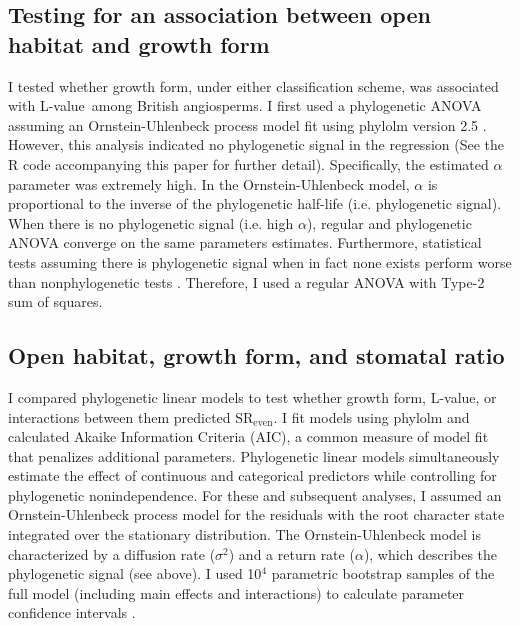 \documentclass[12pt, oneside]{article}
\newcommand{\pkg}[1]{{\fontseries{b}\selectfont #1}}
\newcommand{\el}{L-value}
\begin{document}
\subsection*{Testing for an association between open habitat and growth form}

I tested whether growth form, under either classification scheme, was associated with \el~among British angiosperms. I first used a phylogenetic ANOVA assuming an Ornstein-Uhlenbeck process model fit using \pkg{phylolm} version 2.5 \citep{Ho_Ane_2014}. However, this analysis indicated no phylogenetic signal in the regression (See the R code accompanying this paper for further detail). Specifically, the estimated $\alpha$ parameter was extremely high. In the Ornstein-Uhlenbeck model, $\alpha$ is proportional to the inverse of the phylogenetic half-life (i.e. phylogenetic signal). When there is no phylogenetic signal (i.e. high $\alpha$), regular and phylogenetic ANOVA converge on the same parameters estimates. Furthermore, statistical tests assuming there is phylogenetic signal when in fact none exists perform worse than nonphylogenetic tests \citep{Revell_2010}. Therefore, I used a regular ANOVA with Type-2 sum of squares. 

\subsection*{Open habitat, growth form, and stomatal ratio}

I compared phylogenetic linear models to test whether growth form, \el, or interactions between them predicted $\textrm{SR}_\textrm{even}$. I fit models using \pkg{phylolm} and calculated Akaike Information Criteria (AIC), a common measure of model fit that penalizes additional parameters. Phylogenetic linear models simultaneously estimate the effect of continuous and categorical predictors while controlling for phylogenetic nonindependence. For these and subsequent analyses, I assumed an Ornstein-Uhlenbeck process model for the residuals with the root character state integrated over the stationary distribution. The Ornstein-Uhlenbeck model is characterized by a diffusion rate ($\sigma ^ 2$) and a return rate ($\alpha$), which describes the phylogenetic signal (see above). I used 10$^4$ parametric bootstrap samples of the full model (including main effects and interactions) to calculate parameter confidence intervals \citep{Boettiger_etal_2012}. 
\end{document}
